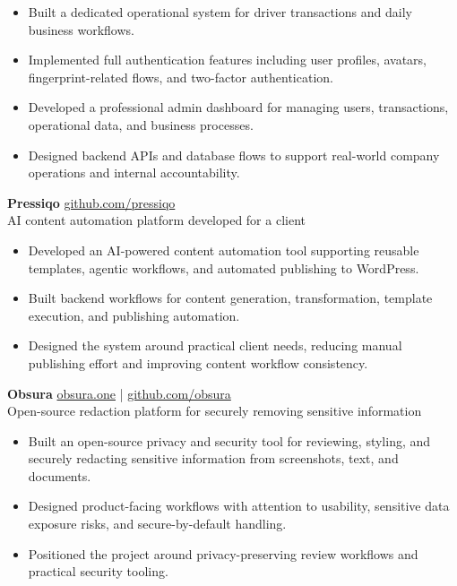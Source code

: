 \documentclass[10pt,a4paper]{article}
\newcommand{\project}[3]{
  \textbf{\color{heading} #1} \hfill {\small \color{muted} #2}\\
  {\small \color{muted} #3}
  \vspace{2pt}
}
\begin{document}
\begin{itemize}
  \item Built a dedicated operational system for driver transactions and daily business workflows.
  \item Implemented full authentication features including user profiles, avatars, fingerprint-related flows, and two-factor authentication.
  \item Developed a professional admin dashboard for managing users, transactions, operational data, and business processes.
  \item Designed backend APIs and database flows to support real-world company operations and internal accountability.
\end{itemize}

\vspace{4pt}

\project
  {Pressiqo}
  {\href{https://github.com/pressiqo}{github.com/pressiqo}}
  {AI content automation platform developed for a client}

\begin{itemize}
  \item Developed an AI-powered content automation tool supporting reusable templates, agentic workflows, and automated publishing to WordPress.
  \item Built backend workflows for content generation, transformation, template execution, and publishing automation.
  \item Designed the system around practical client needs, reducing manual publishing effort and improving content workflow consistency.
\end{itemize}

\vspace{4pt}

\project
  {Obsura}
  {\href{https://obsura.one}{obsura.one} \; | \; \href{https://github.com/obsura}{github.com/obsura}}
  {Open-source redaction platform for securely removing sensitive information}

\begin{itemize}
  \item Built an open-source privacy and security tool for reviewing, styling, and securely redacting sensitive information from screenshots, text, and documents.
  \item Designed product-facing workflows with attention to usability, sensitive data exposure risks, and secure-by-default handling.
  \item Positioned the project around privacy-preserving review workflows and practical security tooling.
\end{itemize}
\end{document}
